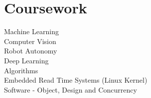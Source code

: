 \documentclass[]{resume-openfont}
\begin{document}
\begin{minipage}[t]{0.36\textwidth}

\section{Coursework}
Machine Learning \\
Computer Vision \\
Robot Autonomy \\
Deep Learning \\
Algorithms \\
Embedded Read Time Systems (Linux Kernel) \\
Software - Object, Design and Concurrency \\
\sectionsep


%
%

\end{minipage} 
\hfill
\end{document}
